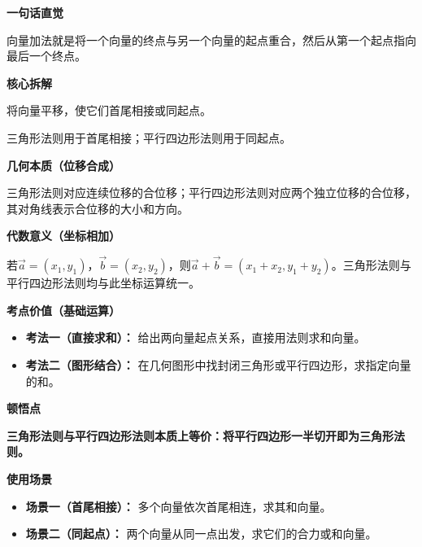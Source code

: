\begin{explanationbox}
	\textbf{\textcolor{CExplanation}{一句话直觉}}

	向量加法就是将一个向量的终点与另一个向量的起点重合，然后从第一个起点指向最后一个终点。

	\medskip
	\textbf{\textcolor{CExplanation}{核心拆解}}
	\begin{description}[style=nextline, leftmargin=2.8em, labelsep=0.5em, itemsep=0.45em]
		\item[\textbf{要点一（平移构造）：}] 将向量平移，使它们首尾相接或同起点。
		\item[\textbf{要点二（图形法则）：}] 三角形法则用于首尾相接；平行四边形法则用于同起点。
	\end{description}

	\medskip
	\textbf{\textcolor{CExplanation}{几何本质（位移合成）}}

	三角形法则对应连续位移的合位移；平行四边形法则对应两个独立位移的合位移，其对角线表示合位移的大小和方向。

	\medskip
	\textbf{\textcolor{CExplanation}{代数意义（坐标相加）}}

	若$\vec{a}=(x_1,y_1)$，$\vec{b}=(x_2,y_2)$，则$\vec{a}+\vec{b}=(x_1+x_2,y_1+y_2)$。三角形法则与平行四边形法则均与此坐标运算统一。

	\medskip
	\textbf{\textcolor{CExplanation}{考点价值（基础运算）}}
	\begin{itemize}[leftmargin=*, itemsep=0.5em, topsep=0.4em]
		\item \textbf{考法一（直接求和）：} 给出两向量起点关系，直接用法则求和向量。
		\item \textbf{考法二（图形结合）：} 在几何图形中找封闭三角形或平行四边形，求指定向量的和。
	\end{itemize}

	\medskip
	\textbf{\textcolor{CExplanation}{顿悟点}}

	\textbf{三角形法则与平行四边形法则本质上等价：将平行四边形一半切开即为三角形法则。}

	\medskip
	\textbf{\textcolor{CExplanation}{使用场景}}
	\begin{itemize}[leftmargin=*, itemsep=0.5em, topsep=0.4em]
		\item \textbf{场景一（首尾相接）：} 多个向量依次首尾相连，求其和向量。
		\item \textbf{场景二（同起点）：} 两个向量从同一点出发，求它们的合力或和向量。
	\end{itemize}
\end{explanationbox}
